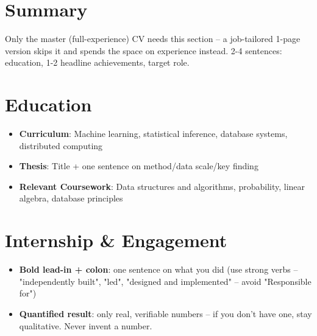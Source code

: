 \documentclass{my-resume}
\begin{document}


\section{Summary}
Only the master (full-experience) CV needs this section -- a job-tailored 1-page version skips it and spends the space on experience instead. 2-4 sentences: education, 1-2 headline achievements, target role.

\section{Education}
\begin{itemize}[parsep=0.2ex]
  \item \textbf{Curriculum}: Machine learning, statistical inference, database systems, distributed computing
  \item \textbf{Thesis}: Title + one sentence on method/data scale/key finding
\end{itemize}
\begin{itemize}[parsep=0.2ex]
  \item \textbf{Relevant Coursework}: Data structures and algorithms, probability, linear algebra, database principles
\end{itemize}

\section{Internship \& Engagement}
\begin{itemize}[parsep=0.2ex]
  \item \textbf{Bold lead-in + colon}: one sentence on what you did (use strong verbs -- "independently built", "led", "designed and implemented" -- avoid "Responsible for")
  \item \textbf{Quantified result}: only real, verifiable numbers -- if you don't have one, stay qualitative. Never invent a number.
\end{itemize}
\end{document}
